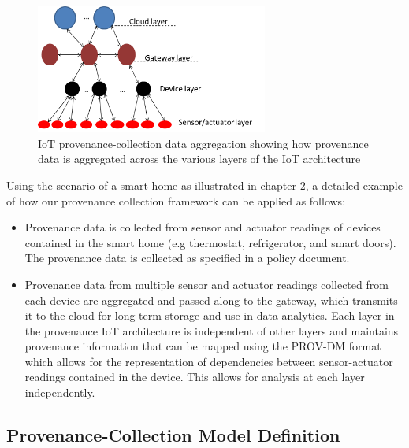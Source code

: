 \begin{figure}[h!]
\begin{center}

\includegraphics[width=3.0in]{iot_aggregation.PNG}    
\end{center}
\caption{IoT provenance-collection data aggregation showing how provenance data is aggregated across the various layers of the IoT architecture}
\label{aggregation}
\end{figure}


Using the scenario of a smart home as illustrated in chapter 2, a detailed example of how our provenance collection framework can be applied as follows:

\begin{itemize}

\item Provenance data is collected from sensor and actuator readings of devices contained in the smart home (e.g thermostat, refrigerator, and smart doors). The provenance data is collected as specified in a policy document. 

\item Provenance data from multiple sensor and actuator readings collected from each device are aggregated and passed along to the gateway, which transmits it to the cloud for long-term storage and use in data analytics. Each layer in the provenance IoT architecture is independent of other layers and maintains provenance information that can be mapped using the PROV-DM format which allows for the representation of dependencies between sensor-actuator readings contained in the device. This allows for analysis at each layer independently. 

\end{itemize}





\subsection{Provenance-Collection Model Definition}

